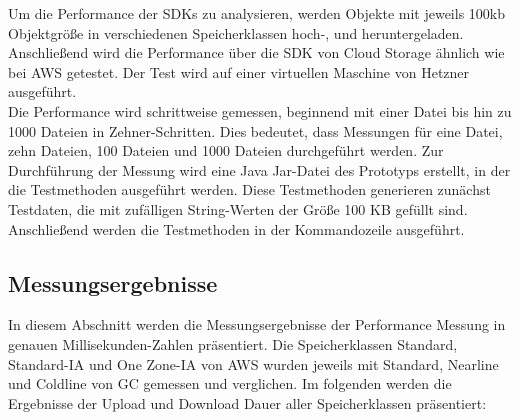 Um die Performance der SDKs zu analysieren, werden Objekte mit jeweils 100kb Objektgröße in verschiedenen Speicherklassen hoch-, und heruntergeladen. Anschließend wird die Performance über die SDK von Cloud Storage ähnlich wie bei AWS getestet. Der Test wird auf einer virtuellen Maschine von Hetzner ausgeführt.\\

Die Performance wird schrittweise gemessen, beginnend mit einer Datei bis hin zu 1000 Dateien in Zehner-Schritten. Dies bedeutet, dass Messungen für eine Datei, zehn Dateien, 100 Dateien und 1000 Dateien durchgeführt werden. Zur Durchführung der Messung wird eine Java Jar-Datei des Prototyps erstellt, in der die Testmethoden ausgeführt werden. Diese Testmethoden generieren zunächst Testdaten, die mit zufälligen String-Werten der Größe 100 KB gefüllt sind. Anschließend werden die Testmethoden in der Kommandozeile ausgeführt.

\newpage

\subsection{Messungsergebnisse}

In diesem Abschnitt werden die Messungsergebnisse der Performance Messung in genauen Millisekunden-Zahlen präsentiert. Die Speicherklassen Standard, Standard-IA und One Zone-IA von AWS wurden jeweils mit Standard, Nearline und Coldline von GC gemessen und verglichen. Im folgenden werden die Ergebnisse der Upload und Download Dauer aller Speicherklassen präsentiert: 

